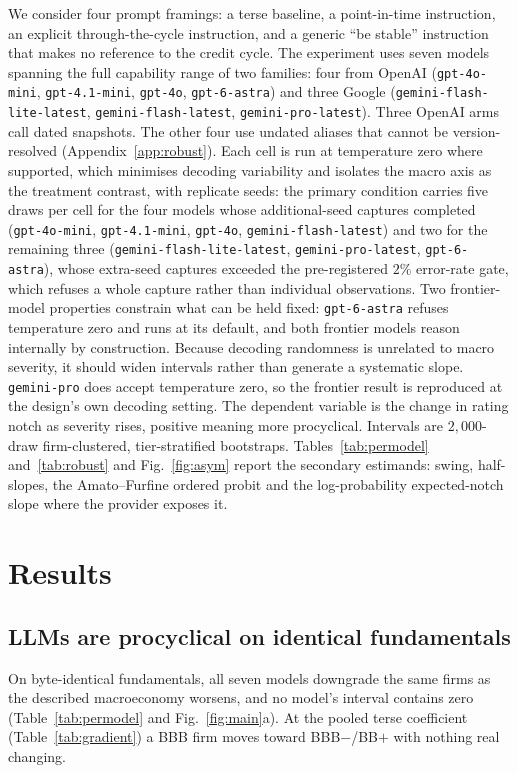\documentclass[a4paper,fleqn]{cas-sc}
\begin{document}
We consider four prompt framings: a terse baseline, a point-in-time instruction, an explicit
through-the-cycle instruction, and a generic ``be stable'' instruction that makes no reference to the
credit cycle. The experiment uses seven models spanning the full capability range of two families: four from OpenAI
(\texttt{gpt-4o-mini}, \texttt{gpt-4.1-mini}, \texttt{gpt-4o}, \texttt{gpt-6-astra}) and three Google
(\texttt{gemini-flash-lite-latest}, \texttt{gemini-flash-latest}, \texttt{gemini-pro-latest}). Three OpenAI arms call dated snapshots. The other four use undated aliases that cannot be version-resolved (Appendix~\ref{app:robust}). Each cell is run at temperature zero where supported, which minimises decoding variability and isolates the macro axis as the treatment contrast, with replicate seeds: the primary condition carries five draws per cell for the four
models whose additional-seed captures completed (\texttt{gpt-4o-mini}, \texttt{gpt-4.1-mini},
\texttt{gpt-4o}, \texttt{gemini-flash-latest}) and two for the remaining three
(\texttt{gemini-flash-lite-latest}, \texttt{gemini-pro-latest}, \texttt{gpt-6-astra}), whose
extra-seed captures exceeded the pre-registered $2$\% error-rate gate, which refuses a whole
capture rather than individual observations. Two frontier-model properties constrain what can be held fixed: \texttt{gpt-6-astra} refuses temperature zero and runs at its default, and both frontier
models reason internally by construction. Because decoding randomness is unrelated to macro
severity, it should widen intervals rather than generate a systematic slope. \texttt{gemini-pro} does accept temperature zero, so the frontier result is reproduced at the
design's own decoding setting.
The dependent variable is the change in rating notch as severity rises,
positive meaning more procyclical. Intervals are $2{,}000$-draw firm-clustered, tier-stratified bootstraps. Tables~\ref{tab:permodel} and~\ref{tab:robust} and Fig.~\ref{fig:asym} report the secondary estimands: swing,
half-slopes, the Amato--Furfine ordered probit and the log-probability expected-notch slope
where the provider exposes it. 

\section{Results}\label{sec:results}
\subsection{LLMs are procyclical on identical fundamentals}\label{sec:pro}
On byte-identical fundamentals, all seven models downgrade the same firms as the described macroeconomy
worsens, and no model's interval contains zero (Table~\ref{tab:permodel} and Fig.~\ref{fig:main}a). At the pooled terse
coefficient (Table~\ref{tab:gradient}) a BBB firm moves toward BBB$-$/BB$+$ with nothing real changing.
\end{document}
